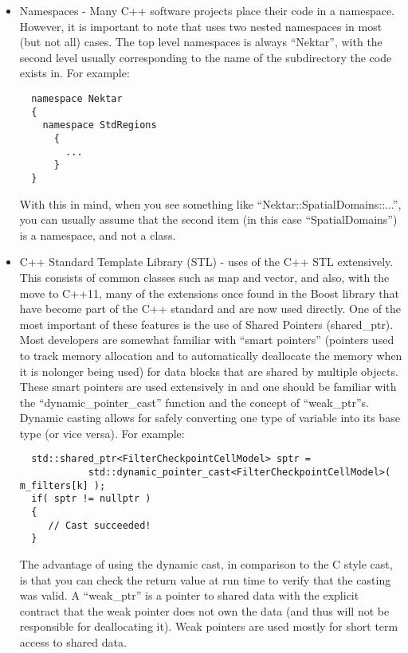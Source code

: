 \begin{itemize}

\item Namespaces - Many C++ software projects place their code in a
  namespace.  However, it is important to note that {\nek} uses two
  nested namespaces in most (but not all) cases.  The top level
  namespaces is always ``Nektar'', with the second level usually
  corresponding to the name of the subdirectory the code exists
  in. For example: \\

\begin{verbatim}
  namespace Nektar
  {
    namespace StdRegions
      {
        ...
      }
  }
\end{verbatim}

  With this in mind, when you see something like
  ``Nektar::SpatialDomains::...'', you can usually assume that the
  second item (in this case ``SpatialDomains'') is a namespace, and
  not a class.

\item C++ Standard Template Library (STL) - {\nek} uses of the C++
  STL extensively.  This consists of common classes such as map and
  vector, and also, with the move to C++11, many of the extensions once found
  in the Boost library that have become part of the C++ standard and are
  now used directly.  One of the most important of these features is
  the use of Shared Pointers (shared\_ptr).  Most developers are
  somewhat familiar with ``smart pointers'' (pointers used to track
  memory allocation and to automatically deallocate the memory when it
  is nolonger being used) for data blocks that are shared by multiple
  objects. These smart pointers are used extensively in {\nek} and
  one should be familiar with the ``dynamic\_pointer\_cast'' function
  and the concept of ``weak\_ptr''s.  Dynamic casting allows for safely
  converting one type of variable into its base type (or vice
  versa). For example: \\

\begin{verbatim}
  std::shared_ptr<FilterCheckpointCellModel> sptr =
            std::dynamic_pointer_cast<FilterCheckpointCellModel>( m_filters[k] );
  if( sptr != nullptr ) 
  { 
     // Cast succeeded!
  }
\end{verbatim}

  The advantage of using the dynamic cast, in comparison to the C style
  cast, is that you can check the return value at run time to verify
  that the casting was valid.  A ``weak\_ptr'' is a pointer to shared
  data with the explicit contract that the weak pointer does not own
  the data (and thus will not be responsible for deallocating it).
  Weak pointers are used mostly for short term access to shared data.


\end{itemize}
